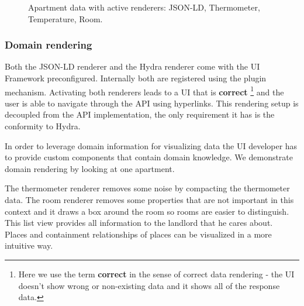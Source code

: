 \begin{figure}[!htb]
  \caption{Apartment data with active renderers: JSON-LD, Thermometer, Temperature, Room.}
\end{figure}

\subsubsection{Domain rendering}
Both the JSON-LD renderer and the Hydra renderer come with the UI Framework preconfigured. Internally both are registered using the plugin mechanism. Activating both renderers leads to a UI that is \textbf{correct} \footnote{Here we use the term \textbf{correct} in the sense of correct data rendering - the UI doesn't show wrong or non-existing data and it shows all of the response data.} and the user is able to navigate through the API using hyperlinks. This rendering setup is decoupled from the API implementation, the only requirement it has is the conformity to Hydra.

In order to leverage domain information for visualizing data the UI developer has to provide custom components that contain domain knowledge. We demonstrate domain rendering by looking at one apartment.

The thermometer renderer removes some noise by compacting the thermometer data. The room renderer removes some properties that are not important in this context and it draws a box around the room so rooms are easier to distinguish. This list view provides all information to the landlord that he cares about. \\ Places and containment relationships of places can be visualized in a more intuitive way.

